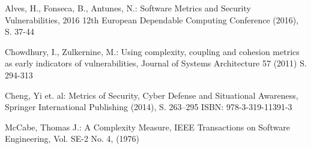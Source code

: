 
\begin{thebibliography}{8}
Alves, H., Fonseca, B., Antunes, N.: Software Metrics and Security Vulnerabilities, 2016 12th European Dependable Computing Conference (2016), S. 37-44

Chowdhury, I., Zulkernine, M.: Using complexity, coupling and cohesion metrics as early indicators of vulnerabilities, Journal of Systems Architecture 57 (2011) S. 294-313

Cheng, Yi et. al: Metrics of Security, Cyber Defense and Situational Awareness, Springer International Publishing (2014), S. 263--295
ISBN: 978-3-319-11391-3

McCabe, Thomas J.: A Complexity Measure, IEEE Transactions on Software Engineering, Vol. SE-2 No. 4, (1976)
\end{thebibliography}

